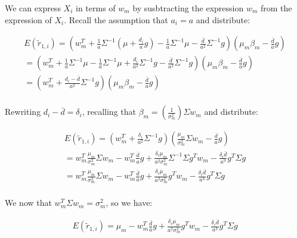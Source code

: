 We can express $X_i$ in terms of $w_m$ by susbtracting the expression $w_m$ 
from the expression of $X_i$. Recall the assumption that $a_i = a$ and distribute:

\begin{equation}
    \begin{aligned}
        E(\tilde{r}_{1,i}) = (w_m^T + \frac{1}{a} \Sigma^{-1} (\mu + \frac{d_i}{a}g) - \frac{1}{a} \Sigma^{-1} \mu - \frac{\bar{d}}{a^2} \Sigma^{-1} g) (\mu_m \beta_m - \frac{\bar{d}}{a} g) \\
        = (w_m^T + \frac{1}{a} \Sigma^{-1}\mu - \frac{1}{a} \Sigma^{-1} \mu + \frac{d_i}{a^2}\Sigma^{-1}g - \frac{\bar{d}}{a^2} \Sigma^{-1}g)(\mu_m \beta_m - \frac{\bar{d}}{a}g)\\
        = (w_m^T + \frac{d_i - \bar{d}}{a^2} \Sigma^{-1} g) (\mu_m \beta_m - \frac{\bar{d}}{a} g) \\
    \end{aligned}
\end{equation}

Rewriting $d_i - \bar{d} = \delta_i$, recalling that $\beta_m = (\frac{1}{\sigma^2_m})\Sigma w_m$ and distribute:

\begin{equation}
    \begin{aligned}
        E(\tilde{r}_{1,i}) = (w_m^T + \frac{\delta_i}{a^2} \Sigma^{-1} g) (\frac{\mu_m}{\sigma^2_m} \Sigma w_m - \frac{\bar{d}}{a}g) \\
= w_m^T \frac{\mu_m}{\sigma^2_m} \Sigma w_m - w_m^T \frac{\bar{d}}{a} g + \frac{\delta_i \mu_m}{a^2\sigma^2_m}\Sigma^{-1}\Sigma g^T w_m - \frac{\delta_i \bar{d}}{a^3} g^T \Sigma g \\
= w_m^T \frac{\mu_m}{\sigma^2_m} \Sigma w_m - w_m^T \frac{\bar{d}}{a} g + \frac{\delta_i \mu_m}{a^2\sigma^2_m} g^T w_m - \frac{\delta_i \bar{d}}{a^3} g^T \Sigma g\\
    \end{aligned}
\end{equation}

We now that $w_m^T \Sigma w_m = \sigma^2_m$, so we have:

\begin{equation}
    \begin{aligned}
        E(\tilde{r}_{1,i}) = \mu_m - w_m^T \frac{\bar{d}}{a}g + \frac{\delta_i \mu_m}{a^2\sigma^2_m} g^T w_m - \frac{\delta_i \bar{d}}{a^3} g^T \Sigma g\\
    \end{aligned}
\end{equation}

